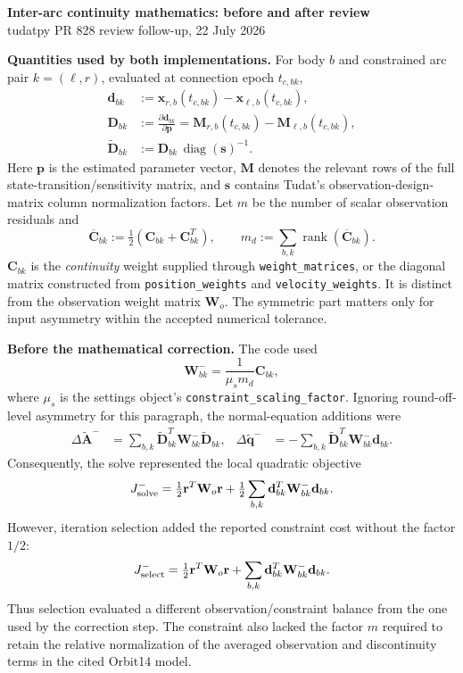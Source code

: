 \documentclass[10pt]{article}
\newcommand{\Cbar}{\overline{\mathbf C}}
\newcommand{\Dt}{\widetilde{\mathbf D}}
\begin{document}
\begin{center}
  {\Large\bfseries Inter-arc continuity mathematics: before and after review}\\[2pt]
  {\small tudatpy PR 828 review follow-up, 22 July 2026}
\end{center}

\textbf{Quantities used by both implementations.}
For body $b$ and constrained arc pair $k=(\ell,r)$, evaluated at connection epoch $t_{c,bk}$,
\begin{align*}
 \mathbf d_{bk} &:= \mathbf x_{r,b}(t_{c,bk})-\mathbf x_{\ell,b}(t_{c,bk}),\\
 \mathbf D_{bk} &:= \frac{\partial\mathbf d_{bk}}{\partial\mathbf p}
 =\mathbf M_{r,b}(t_{c,bk})-\mathbf M_{\ell,b}(t_{c,bk}),\\
 \Dt_{bk} &:= \mathbf D_{bk}\,\operatorname{diag}(\mathbf s)^{-1}.
\end{align*}
Here $\mathbf p$ is the estimated parameter vector, $\mathbf M$ denotes the relevant rows of the full
state-transition/sensitivity matrix, and $\mathbf s$ contains Tudat's observation-design-matrix column
normalization factors.  Let $m$ be the number of scalar observation residuals and
\[
 \Cbar_{bk}:=\tfrac12(\mathbf C_{bk}+\mathbf C_{bk}^{T}),\qquad
 m_d:=\sum_{b,k}\operatorname{rank}(\Cbar_{bk}).
\]
$\mathbf C_{bk}$ is the \emph{continuity} weight supplied through \nolinkurl{weight_matrices}, or the diagonal
matrix constructed from \nolinkurl{position_weights} and \nolinkurl{velocity_weights}.  It is distinct from the
observation weight matrix $\mathbf W_o$.  The symmetric part matters only for input asymmetry within the
accepted numerical tolerance.

\textbf{Before the mathematical correction.}
The code used
\[
 \mathbf W^-_{bk}=\frac{1}{\mu_s m_d}\mathbf C_{bk},
\]
where $\mu_s$ is the settings object's \texttt{constraint\_scaling\_factor}.  Ignoring round-off-level
asymmetry for this paragraph, the normal-equation additions were
\begin{align*}
 \Delta\widetilde{\mathbf A}^{-}
 &=\sum_{b,k}\Dt_{bk}^{T}\mathbf W^-_{bk}\Dt_{bk},&
 \Delta\widetilde{\mathbf q}^{-}
 &=-\sum_{b,k}\Dt_{bk}^{T}\mathbf W^-_{bk}\mathbf d_{bk}.
\end{align*}
Consequently, the solve represented the local quadratic objective
\[
 J^-_{\rm solve}=\tfrac12\mathbf r^T\mathbf W_o\mathbf r
 +\tfrac12\sum_{b,k}\mathbf d_{bk}^{T}\mathbf W^-_{bk}\mathbf d_{bk}.
\]
However, iteration selection added the reported constraint cost without the factor $1/2$:
\[
 J^-_{\rm select}=\tfrac12\mathbf r^T\mathbf W_o\mathbf r
 +\sum_{b,k}\mathbf d_{bk}^{T}\mathbf W^-_{bk}\mathbf d_{bk}.
\]
Thus selection evaluated a different observation/constraint balance from the one used by the correction step.
The constraint also lacked the factor $m$ required to retain the relative normalization of the averaged
observation and discontinuity terms in the cited Orbit14 model.
\end{document}
